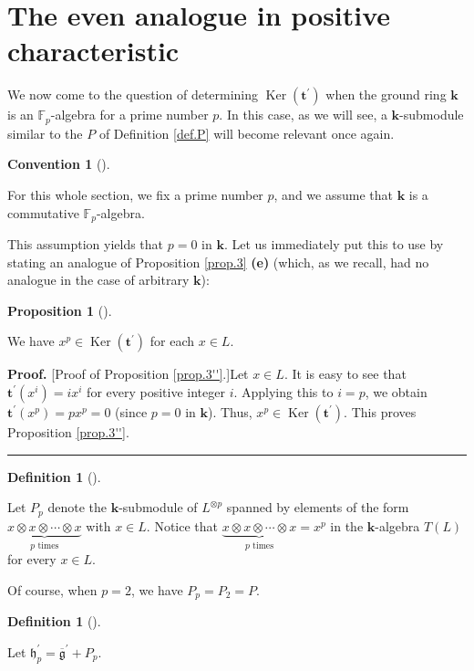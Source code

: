 \documentclass[numbers=enddot,12pt,final,onecolumn,notitlepage]{scrartcl}%
\theoremstyle{definition}
\newtheorem{prop}[theo]{Proposition}
\newenvironment{proposition}[1][]
{\begin{prop}[#1]\begin{leftbar}}
{\end{leftbar}\end{prop}}
\newtheorem{defi}[theo]{Definition}
\newenvironment{definition}[1][]
{\begin{defi}[#1]\begin{leftbar}}
{\end{leftbar}\end{defi}}
\newtheorem{conv}[theo]{Convention}
\newenvironment{condition}[1][]
{\begin{conv}[#1]\begin{leftbar}}
{\end{leftbar}\end{conv}}
\newenvironment{proof}[1][Proof]{\noindent\textbf{#1.} }{\ \rule{0.5em}{0.5em}}
\begin{document}
\section{The even analogue in positive characteristic}

We now come to the question of determining $\operatorname*{Ker}\left(
\mathbf{t}^{\prime}\right)  $ when the ground ring $\mathbf{k}$ is an
$\mathbb{F}_{p}$-algebra for a prime number $p$. In this case, as we will see,
a $\mathbf{k}$-submodule similar to the $P$ of Definition \ref{def.P} will
become relevant once again.

\begin{condition}
For this whole section, we fix a prime number $p$, and we assume that
$\mathbf{k}$ is a commutative $\mathbb{F}_{p}$-algebra.
\end{condition}

This assumption yields that $p=0$ in $\mathbf{k}$. Let us immediately put this
to use by stating an analogue of Proposition \ref{prop.3} \textbf{(e)} (which,
as we recall, had no analogue in the case of arbitrary $\mathbf{k}$):

\begin{proposition}
\label{prop.3''}We have $x^{p}\in\operatorname*{Ker}\left(  \mathbf{t}%
^{\prime}\right)  $ for each $x\in L$.
\end{proposition}

\begin{proof}
[Proof of Proposition \ref{prop.3''}.]Let $x\in L$. It is easy to see that
$\mathbf{t}^{\prime}\left(  x^{i}\right)  =ix^{i}$ for every positive integer
$i$. Applying this to $i=p$, we obtain $\mathbf{t}^{\prime}\left(
x^{p}\right)  =px^{p}=0$ (since $p=0$ in $\mathbf{k}$). Thus, $x^{p}%
\in\operatorname*{Ker}\left(  \mathbf{t}^{\prime}\right)  $. This proves
Proposition \ref{prop.3''}.
\end{proof}

\begin{definition}
\label{def.Pp}Let $P_{p}$ denote the $\mathbf{k}$-submodule of $L^{\otimes p}$
spanned by elements of the form $\underbrace{x\otimes x\otimes\cdots\otimes
x}_{p\text{ times}}$ with $x\in L$. Notice that $\underbrace{x\otimes
x\otimes\cdots\otimes x}_{p\text{ times}}=x^{p}$ in the $\mathbf{k}$-algebra
$T\left(  L\right)  $ for every $x\in L$.
\end{definition}

Of course, when $p=2$, we have $P_{p}=P_{2}=P$.

\begin{definition}
Let $\mathfrak{h}_{p}^{\prime}=\overline{\mathfrak{g}}^{\prime}+P_{p}$.
\end{definition}
\end{document}
